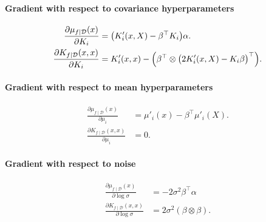 \documentclass{article}
\newcommand{\given}{\mid}
\newcommand{\cm}[1]{\mathcal{#1}}
\newcommand{\data}{\cm{D}}
\newcommand{\trans}{^{\top}}
\begin{document}
\paragraph{Gradient with respect to covariance hyperparameters}

\begin{align*}
  \frac{\partial \mu_{f \given \data}(x)}{\partial K_i}
  &=
  \bigl(K'_i(x, X) - \beta\trans K_i\bigr)\alpha.
  \\
  \frac{\partial K_{f \given \data}(x, x)}{\partial K_i}
  &=
  K'_i(x, x) -
  \Bigl(
  \beta\trans
  \otimes
  \bigl(
  2 K'_i(x, X) - K_i \beta
  \bigr)\trans
  \Bigr).
\end{align*}

\paragraph{Gradient with respect to mean hyperparameters}

\begin{align*}
  \frac{\partial \mu_{f \given \data}(x)}{\partial \mu_i}
  &=
  \mu'_i(x)
  -
  \beta\trans \mu'_i(X).
  \\
  \frac{\partial K_{f \given \data}(x, x)}{\partial \mu_i}
  &=
  0.
\end{align*}

\paragraph{Gradient with respect to noise}

\begin{align*}
  \frac{\partial \mu_{f \given \data}(x)}{\partial \log \sigma}
  &=
  -2\sigma^2 \beta\trans \alpha
  \\
  \frac{\partial K_{f \given \data}(x, x)}{\partial \log \sigma}
  &=
  2\sigma^2 (\beta \otimes \beta).
\end{align*}
\end{document}
